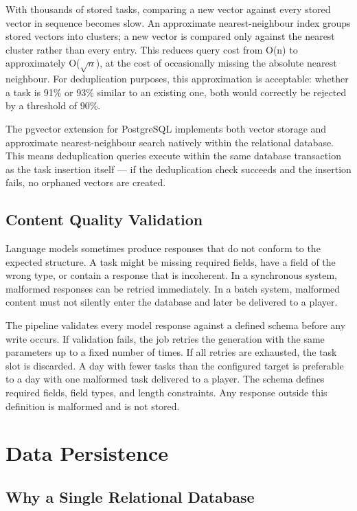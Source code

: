With thousands of stored tasks, comparing a new vector against every stored vector in sequence becomes slow. An approximate nearest-neighbour index groups stored vectors into clusters; a new vector is compared only against the nearest cluster rather than every entry. This reduces query cost from O(n) to approximately O($\sqrt{n}$), at the cost of occasionally missing the absolute nearest neighbour. For deduplication purposes, this approximation is acceptable: whether a task is 91\% or 93\% similar to an existing one, both would correctly be rejected by a threshold of 90\%.

The pgvector extension for PostgreSQL implements both vector storage and approximate nearest-neighbour search natively within the relational database. This means deduplication queries execute within the same database transaction as the task insertion itself --- if the deduplication check succeeds and the insertion fails, no orphaned vectors are created.

\subsection{Content Quality Validation}

Language models sometimes produce responses that do not conform to the expected structure. A task might be missing required fields, have a field of the wrong type, or contain a response that is incoherent. In a synchronous system, malformed responses can be retried immediately. In a batch system, malformed content must not silently enter the database and later be delivered to a player.

The pipeline validates every model response against a defined schema before any write occurs. If validation fails, the job retries the generation with the same parameters up to a fixed number of times. If all retries are exhausted, the task slot is discarded. A day with fewer tasks than the configured target is preferable to a day with one malformed task delivered to a player. The schema defines required fields, field types, and length constraints. Any response outside this definition is malformed and is not stored.

\section{Data Persistence}

\subsection{Why a Single Relational Database}

